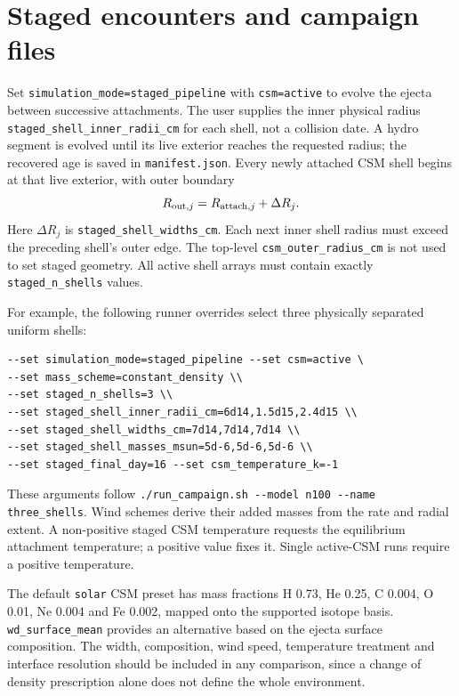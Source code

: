 \documentclass[11pt,a4paper]{article}
\newcommand{\code}[1]{\nolinkurl{#1}}
\begin{document}
\section{Staged encounters and campaign files}
Set \code{simulation_mode=staged_pipeline} with \code{csm=active} to evolve the ejecta between successive attachments. The user supplies the inner physical radius \code{staged_shell_inner_radii_cm} for each shell, not a collision date. A hydro segment is evolved until its live exterior reaches the requested radius; the recovered age is saved in \code{manifest.json}. Every newly attached CSM shell begins at that live exterior, with outer boundary
\begin{equation}
 R_{{\rm out},j}=R_{{\rm attach},j}+\Delta R_j .
\end{equation}
Here $\Delta R_j$ is \code{staged_shell_widths_cm}. Each next inner shell radius must exceed the preceding shell's outer edge. The top-level \code{csm_outer_radius_cm} is not used to set staged geometry. All active shell arrays must contain exactly \code{staged_n_shells} values.

For example, the following runner overrides select three physically separated uniform shells:
\begin{lstlisting}
--set simulation_mode=staged_pipeline --set csm=active \
--set mass_scheme=constant_density \\
--set staged_n_shells=3 \\
--set staged_shell_inner_radii_cm=6d14,1.5d15,2.4d15 \\
--set staged_shell_widths_cm=7d14,7d14,7d14 \\
--set staged_shell_masses_msun=5d-6,5d-6,5d-6 \\
--set staged_final_day=16 --set csm_temperature_k=-1
\end{lstlisting}
These arguments follow \code{./run_campaign.sh --model n100 --name three_shells}. Wind schemes derive their added masses from the rate and radial extent. A non-positive staged CSM temperature requests the equilibrium attachment temperature; a positive value fixes it. Single active-CSM runs require a positive temperature.

The default \code{solar} CSM preset has mass fractions H 0.73, He 0.25, C 0.004, O 0.01, Ne 0.004 and Fe 0.002, mapped onto the supported isotope basis. \code{wd_surface_mean} provides an alternative based on the ejecta surface composition. The width, composition, wind speed, temperature treatment and interface resolution should be included in any comparison, since a change of density prescription alone does not define the whole environment.
\end{document}
